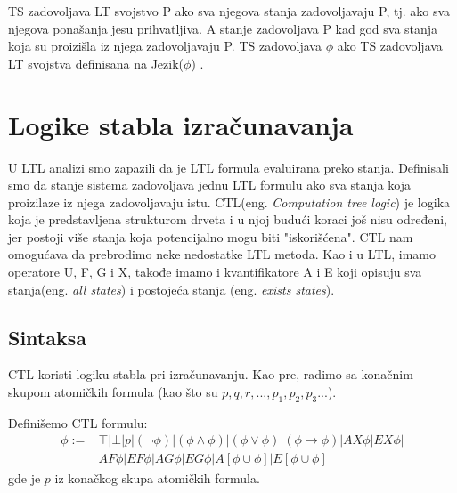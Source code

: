 \documentclass[a4paper]{article}
\begin{document}
{	TS zadovoljava LT svojstvo P ako sva njegova stanja zadovoljavaju P, tj. ako sva njegova ponašanja jesu prihvatljiva. A stanje zadovoljava P kad god sva stanja koja su proizišla iz njega zadovoljavaju P. TS zadovoljava  $\phi$ ako TS zadovoljava LT svojstva definisana na Jezik($\phi$) \cite{reeves1990logic}.


	\section{Logike stabla izračunavanja}
	\label{sec:CTL}
	U LTL analizi smo zapazili da je LTL formula evaluirana preko stanja. Definisali smo da stanje sistema
	zadovoljava jednu LTL formulu ako sva stanja koja proizilaze iz njega zadovoljavaju istu. CTL(eng. \emph{Computation tree logic}) je logika koja je predstavljena strukturom drveta i u njoj budući koraci još nisu
	određeni, jer postoji više stanja koja potencijalno mogu biti "iskorišćena".
	CTL nam omogućava da prebrodimo neke nedostatke LTL metoda. Kao i u LTL, imamo operatore U, F, G i X, takođe imamo i kvantifikatore
	A i E koji opisuju sva stanja(eng. \emph{all states}) i postojeća stanja (eng. \emph{exists states}). 

\subsection{Sintaksa}
	\label{subsec:podnaslovN}
	CTL koristi logiku stabla pri izračunavanju. 
	Kao pre, radimo sa konačnim skupom atomičkih formula (kao što su $p, q, r,...,p_1,p_2,p_3...$).

	Definišemo CTL formulu:
\begin{equation}
\begin{split}
\phi := &\top| \bot | p | (\neg \phi) | (\phi \wedge \phi) | (\phi \vee \phi) | (\phi \rightarrow \phi)| AX\phi | EX\phi | \\
          &  AF\phi | EF\phi | AG\phi | EG\phi | A[\phi \cup \phi] | E[\phi \cup \phi]
\end{split}
\end{equation}
	gde je $p$ iz konačkog skupa atomičkih formula.
	
}
\end{document}
